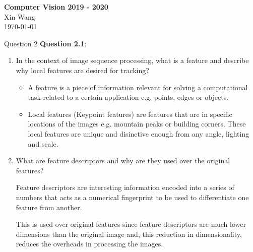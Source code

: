 \documentclass{article}
\newcommand{\maketitletwo}[2][]{\begin{center}
        \Large{\textbf{Computer Vision #1 \\ } }
        \vspace{5pt}
        \normalsize{Xin Wang \\ 
        \today}   
        \vspace{15pt}
\end{center}}
\begin{document}
    \maketitletwo[2019 - 2020] 

    \section{Question 2}
    \textbf{Question 2.1}: 
    \begin{enumerate}
        \item In the context of image sequence processing, what is a feature and describe
        why local features are desired for tracking?

        \begin{itemize}
            \item A feature is a piece of information relevant for solving a computational
            task related to a certain application e.g. points, edges or objects. 
            \item Local features (Keypoint features) are features that are in
            specific locations of the  images e.g. mountain peaks or building
            corners. These local features are unique and disinctive enough from
            any angle, lighting and scale. 
        \end{itemize}

        \item What are feature descriptors and why are they used over the original
        features?

        Feature descriptors are interesting information encoded into a series of
        numbers that acts as a numerical fingerprint to be used to differentiate
        one feature from another. 

        This is used over original features since feature descriptors are much
        lower dimensions than the original image and, this reduction in
        dimensionality, reduces the overheads in processing the images. 
    \end{enumerate}
\end{document}
